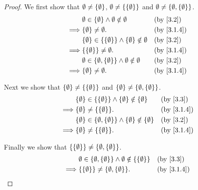 \begin{proof}
	We first show that \(\emptyset \neq \left\lbrace\emptyset\right\rbrace\), \(\emptyset \neq \left\lbrace\left\lbrace\emptyset\right\rbrace\right\rbrace\) and \(\emptyset \neq \left\lbrace\emptyset, \left\lbrace\emptyset\right\rbrace\right\rbrace\).
	\begin{align*}
		         & \emptyset \in \set{\emptyset} \land \emptyset \notin \emptyset                   &  & \by{3.2}   \\
		\implies & \set{\emptyset} \neq \emptyset.                                                  &  & \by{3.1.4} \\
		         & \set{\emptyset} \in \set{\set{\emptyset}} \land \set{\emptyset} \notin \emptyset &  & \by{3.2}   \\
		\implies & \set{\set{\emptyset}} \neq \emptyset.                                            &  & \by{3.1.4} \\
		         & \emptyset \in \set{\emptyset, \set{\emptyset}} \land \emptyset \notin \emptyset  &  & \by{3.2}   \\
		\implies & \set{\emptyset} \neq \emptyset.                                                  &  & \by{3.1.4}
	\end{align*}

	Next we show that \(\left\lbrace\emptyset\right\rbrace \neq \left\lbrace\left\lbrace\emptyset\right\rbrace\right\rbrace\) and \(\left\lbrace\emptyset\right\rbrace \neq \left\lbrace\emptyset, \left\lbrace\emptyset\right\rbrace\right\rbrace\).
	\begin{align*}
		         & \set{\emptyset} \in \set{\set{\emptyset}} \land \set{\emptyset} \notin \set{\emptyset}            &  & \by{3.3}   \\
		\implies & \set{\emptyset} \neq \set{\set{\emptyset}}.                                                       &  & \by{3.1.4} \\
		         & \set{\emptyset} \in \set{\emptyset, \set{\emptyset}} \land \set{\emptyset} \notin \set{\emptyset} &  & \by{3.2}   \\
		\implies & \set{\emptyset} \neq \set{\set{\emptyset}}.                                                       &  & \by{3.1.4}
	\end{align*}

	Finally we show that \(\left\lbrace\left\lbrace\emptyset\right\rbrace\right\rbrace \neq \left\lbrace\emptyset, \left\lbrace\emptyset\right\rbrace\right\rbrace\).
	\begin{align*}
		         & \emptyset \in \set{\emptyset, \set{\emptyset}} \land \emptyset \notin \set{\set{\emptyset}} &  & \by{3.3}   \\
		\implies & \set{\set{\emptyset}} \neq \set{\emptyset, \set{\emptyset}}.                                &  & \by{3.1.4}
	\end{align*}
\end{proof}

